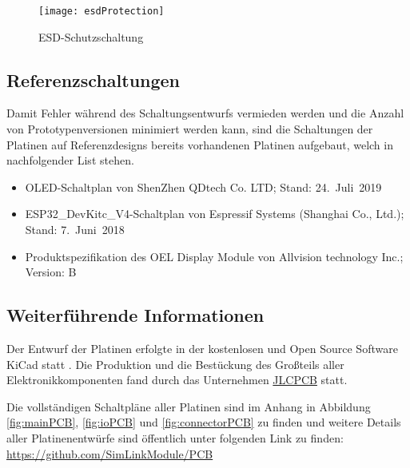 \begin{figure}[h]
    \centering
    \texttt{[image: esdProtection]}
    \caption{\ac{ESD}-Schutzschaltung}
    \label{fig:esdProtection}
\end{figure}

\subsection{Referenzschaltungen}
Damit Fehler während des Schaltungsentwurfs vermieden werden und die Anzahl von Prototypenversionen minimiert werden kann, sind die Schaltungen der Platinen auf Referenzdesigns bereits vorhandenen Platinen aufgebaut, welch in nachfolgender List stehen.
\begin{itemize}
    \item \acs{OLED}-Schaltplan von ShenZhen QDtech Co. LTD; Stand: 24.~Juli~2019
    \item ESP32\_DevKitc\_V4-Schaltplan von Espressif Systems (Shanghai Co., Ltd.); Stand: 7.~Juni~2018
    \item Produktspezifikation des OEL Display Module von Allvision technology Inc.; Version: B
\end{itemize}

\subsection{Weiterführende Informationen}
Der Entwurf der Platinen erfolgte in der kostenlosen und Open Source Software KiCad statt \cite{aboutkicad}. Die Produktion und die Bestückung des Großteils aller Elektronikkomponenten fand durch das Unternehmen \href{https://jlcpcb.com/}{JLCPCB} statt.

Die vollständigen Schaltpläne aller Platinen sind im Anhang in Abbildung \ref{fig:mainPCB}, \ref{fig:ioPCB} und  \ref{fig:connectorPCB} zu finden und weitere Details aller Platinenentwürfe sind öffentlich unter folgenden Link zu finden:\\ \url{https://github.com/SimLinkModule/PCB}


